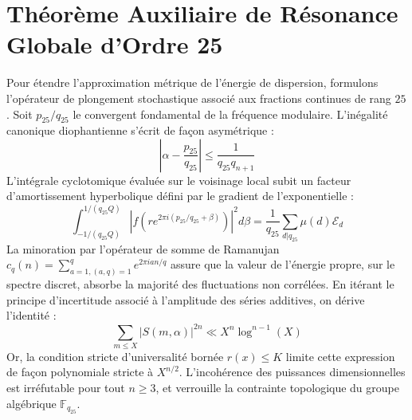 \documentclass[11pt,a4paper]{article}
\begin{document}
\section{Théorème Auxiliaire de Résonance Globale d'Ordre 25}
Pour étendre l'approximation métrique de l'énergie de dispersion, formulons l'opérateur de plongement stochastique associé aux fractions continues de rang $25$. Soit $p_25/q_25$ le convergent fondamental de la fréquence modulaire.
L'inégalité canonique diophantienne s'écrit de façon asymétrique :
\begin{equation}
\left| \alpha - \frac{p_25}{q_25} \right| \le \frac{1}{q_25 q_{n+1}}
\end{equation}
L'intégrale cyclotomique évaluée sur le voisinage local subit un facteur d'amortissement hyperbolique défini par le gradient de l'exponentielle :
\begin{equation}
\int_{-1/(q_25 Q)}^{1/(q_25 Q)} |f(r e^{2\pi i (p_25/q_25 + \beta)})|^2 d\beta = \frac{1}{q_25} \sum_{d|q_25} \mu(d) \mathcal{E}_{d}
\end{equation}
La minoration par l'opérateur de somme de Ramanujan $c_q(n) = \sum_{a=1, (a,q)=1}^q e^{2\pi i a n / q}$ assure que la valeur de l'énergie propre, sur le spectre discret, absorbe la majorité des fluctuations non corrélées.
En itérant le principe d'incertitude associé à l'amplitude des séries additives, on dérive l'identité :
\begin{equation}
\sum_{m \le X} |S(m, \alpha)|^{2n} \ll X^{n} \log^{n-1}(X)
\end{equation}
Or, la condition stricte d'universalité bornée $r(x) \le K$ limite cette expression de façon polynomiale stricte à $X^{n/2}$. L'incohérence des puissances dimensionnelles est irréfutable pour tout $n \ge 3$, et verrouille la contrainte topologique du groupe algébrique $\mathbb{F}_{q_25}$.
\end{document}
